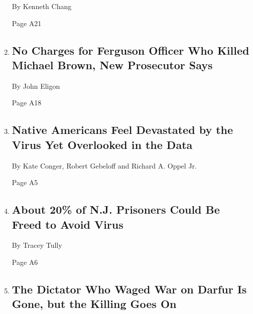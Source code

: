 \begin{enumerate}
  By Kenneth Chang

  Page A21
\item
  \href{/2020/07/30/us/michael-brown-darren-wilson-ferguson.html}{}

  \hypertarget{no-charges-for-ferguson-officer-who-killed-michael-brown-new-prosecutor-says}{%
  \subsection{No Charges for Ferguson Officer Who Killed Michael Brown,
  New Prosecutor
  Says}\label{no-charges-for-ferguson-officer-who-killed-michael-brown-new-prosecutor-says}}

  By John Eligon

  Page A18
\item
  \href{/2020/07/30/us/native-americans-coronavirus-data.html}{}

  \hypertarget{native-americans-feel-devastated-by-the-virus-yet-overlooked-in-the-data}{%
  \subsection{Native Americans Feel Devastated by the Virus Yet
  Overlooked in the
  Data}\label{native-americans-feel-devastated-by-the-virus-yet-overlooked-in-the-data}}

  By Kate Conger, Robert Gebeloff and Richard A. Oppel Jr.

  Page A5
\item
  \href{/2020/07/30/nyregion/New-jersey-inmate-release-Covid.html}{}

  \hypertarget{about-20-of-nj-prisoners-could-be-freed-to-avoid-virus}{%
  \subsection{About 20\% of N.J. Prisoners Could Be Freed to Avoid
  Virus}\label{about-20-of-nj-prisoners-could-be-freed-to-avoid-virus}}

  By Tracey Tully

  Page A6
\item
  \href{/2020/07/30/world/middleeast/darfur-sudan.html}{}

  \hypertarget{the-dictator-who-waged-war-on-darfur-is-gone-but-the-killing-goes-on}{%
  \subsection{The Dictator Who Waged War on Darfur Is Gone, but the
  Killing Goes
  On}\label{the-dictator-who-waged-war-on-darfur-is-gone-but-the-killing-goes-on}}


\end{enumerate}
